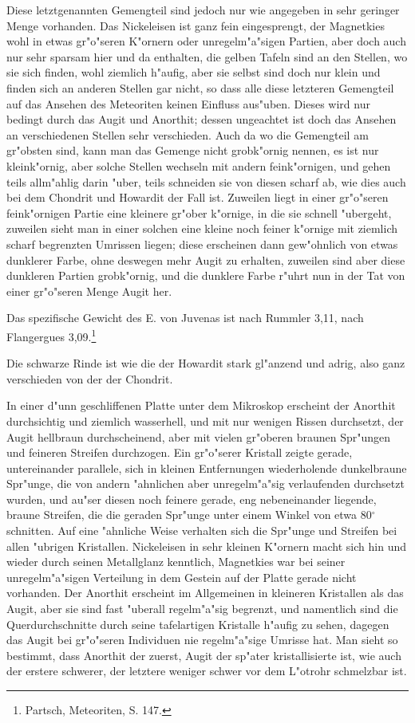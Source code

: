 \documentclass[a4paper, 11pt, oneside]{article}
\begin{document}
Diese letztgenannten Gemengteil sind jedoch nur wie angegeben in sehr geringer Menge vorhanden. Das Nickeleisen ist ganz fein eingesprengt, der Magnetkies wohl in etwas gr"o"seren K"ornern oder unregelm"a"sigen Partien, aber doch auch nur sehr sparsam hier und da enthalten, die gelben Tafeln sind an den Stellen, wo sie sich finden, wohl ziemlich h"aufig, aber sie selbst sind doch nur klein und finden sich an anderen Stellen gar nicht, so dass alle diese letzteren Gemengteil auf das Ansehen des Meteoriten keinen Einfluss aus"uben. Dieses wird nur bedingt durch das Augit und Anorthit; dessen ungeachtet ist doch das Ansehen an verschiedenen Stellen sehr verschieden. Auch da wo die Gemengteil am gr"obsten sind, kann man das Gemenge nicht grobk"ornig nennen, es ist nur kleink"ornig, aber solche Stellen wechseln mit andern feink"ornigen, und gehen teils allm"ahlig darin "uber, teils schneiden sie von diesen scharf ab, wie dies auch bei dem Chondrit und Howardit der Fall ist. Zuweilen liegt in einer gr"o"seren feink"ornigen Partie eine kleinere gr"ober k"ornige, in die sie schnell "ubergeht, zuweilen sieht man in einer solchen eine kleine noch feiner k"ornige mit ziemlich scharf begrenzten Umrissen liegen; diese erscheinen dann gew"ohnlich von etwas dunklerer Farbe, ohne deswegen mehr Augit zu erhalten, zuweilen sind aber diese dunkleren Partien grobk"ornig, und die dunklere Farbe r"uhrt nun in der Tat von einer gr"o"seren Menge Augit her.

Das spezifische Gewicht des E. von Juvenas ist nach Rummler 3,11, nach Flangergues 3,09.\footnote{Partsch, Meteoriten, S. 147.}

Die schwarze Rinde ist wie die der Howardit stark gl"anzend und adrig, also ganz verschieden von der der Chondrit.

In einer d"unn geschliffenen Platte unter dem Mikroskop erscheint der Anorthit durchsichtig und ziemlich wasserhell, und mit nur wenigen Rissen durchsetzt, der Augit hellbraun durchscheinend, aber mit vielen gr"oberen braunen Spr"ungen und feineren Streifen durchzogen. Ein gr"o"serer Kristall zeigte gerade, untereinander parallele, sich in kleinen Entfernungen wiederholende dunkelbraune Spr"unge, die von andern "ahnlichen aber unregelm"a"sig verlaufenden durchsetzt wurden, und au"ser diesen noch feinere gerade, eng nebeneinander liegende, braune Streifen, die die geraden Spr"unge unter einem Winkel von etwa 80$^{\circ}$ schnitten. Auf eine "ahnliche Weise verhalten sich die Spr"unge und Streifen bei allen "ubrigen Kristallen. Nickeleisen in sehr kleinen K"ornern macht sich hin und wieder durch seinen Metallglanz kenntlich, Magnetkies war bei seiner unregelm"a"sigen Verteilung in dem Gestein auf der Platte gerade nicht vorhanden. Der Anorthit erscheint im Allgemeinen in kleineren Kristallen als das Augit, aber sie sind fast "uberall regelm"a"sig begrenzt, und namentlich sind die Querdurchschnitte durch seine tafelartigen Kristalle h"aufig zu sehen, dagegen das Augit bei gr"o"seren Individuen nie regelm"a"sige Umrisse hat. Man sieht so bestimmt, dass Anorthit der zuerst, Augit der sp"ater kristallisierte ist, wie auch der erstere schwerer, der letztere weniger schwer vor dem L"otrohr schmelzbar ist.
\end{document}
